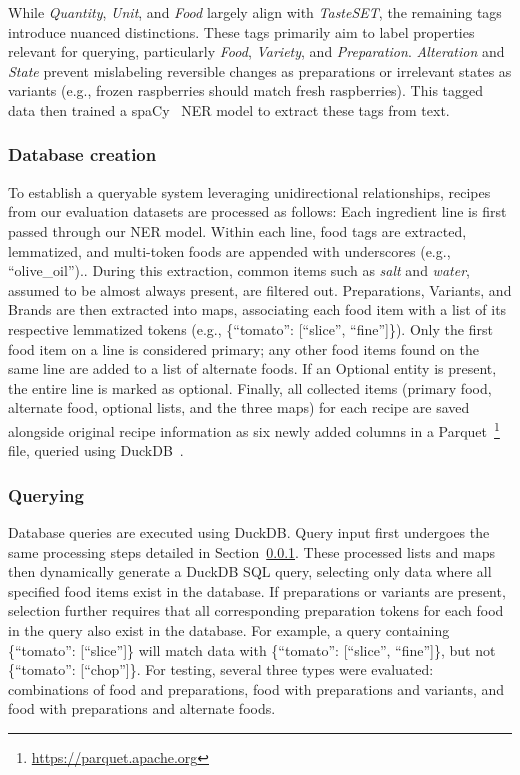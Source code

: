 \documentclass[11pt]{article}
\begin{document}
While \emph{Quantity}, \emph{Unit}, and \emph{Food} largely align with
\emph{TasteSET}, the remaining tags introduce nuanced distinctions.
These tags primarily aim to label properties relevant for querying, particularly
\emph{Food}, \emph{Variety}, and \emph{Preparation}.
\emph{Alteration} and \emph{State} prevent mislabeling reversible changes as
preparations or irrelevant states as variants (e.g., frozen raspberries should
match fresh raspberries).
This tagged data then trained a spaCy~\cite{spacy} NER model to extract these
tags from text.

\subsubsection{Database creation}\label{sec:dbStructure}
To establish a queryable system leveraging unidirectional relationships, recipes
from our evaluation datasets are processed as follows: Each ingredient line is
first passed through our NER model.
Within each line, food tags are extracted, lemmatized, and multi-token foods are
appended with underscores (e.g., ``olive\_oil'')..
During this extraction, common items such as \emph{salt} and \emph{water},
assumed to be almost always present, are filtered out.
Preparations, Variants, and Brands are then extracted into maps, associating
each food item with a list of its respective lemmatized tokens (e.g.,
\{``tomato'': [``slice'', ``fine'']\}).
Only the first food item on a line is considered primary; any other food items
found on the same line are added to a list of alternate foods.
If an Optional entity is present, the entire line is marked as optional.
Finally, all collected items (primary food, alternate food, optional lists, and
the three maps) for each recipe are saved alongside original recipe information
as six newly added columns in a
Parquet~\footnote{\url{https://parquet.apache.org}} file, queried using
DuckDB~\cite{duckdb}.

\subsubsection{Querying}
Database queries are executed using DuckDB\@.
Query input first undergoes the same processing steps detailed in
Section~\ref{sec:dbStructure}.
These processed lists and maps then dynamically generate a DuckDB SQL query,
selecting only data where all specified food items exist in the database.
If preparations or variants are present, selection further requires that all
corresponding preparation tokens for each food in the query also exist in the
database.
For example, a query containing \{``tomato'': [``slice'']\} will match data with
\{``tomato'': [``slice'', ``fine'']\}, but not \{``tomato'': [``chop'']\}.
For testing, several three types were evaluated: combinations of food and
preparations, food with preparations and variants, and food with preparations
and alternate foods.
\end{document}
